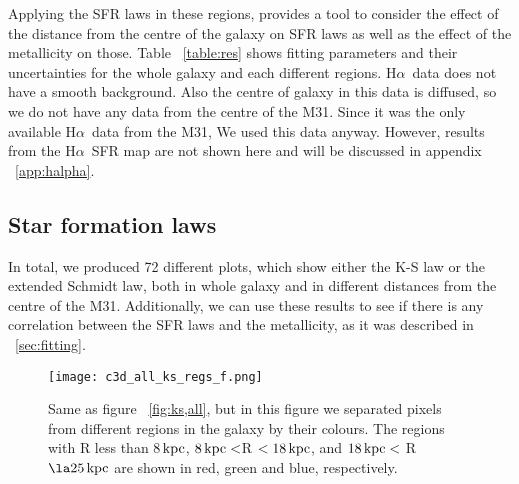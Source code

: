 \documentclass[useAMS,usenatbib]{mn2e}
\newcommand \kpc        {\,{\rm kpc}}
\newcommand \halpha    {H$\alpha $\ }
\begin{document}
Applying the SFR laws in these regions, provides a tool to consider the effect of the distance from the centre of the galaxy on SFR laws as well as the effect of the metallicity on those. Table ~\ref{table:res} shows fitting parameters and their uncertainties for the whole galaxy and each different regions. \halpha data does not have a smooth background. Also the centre of galaxy in this data is diffused, so we do not have any data from the centre of the M31. Since it was the only available \halpha data from the M31, We used this data anyway. However, results from the \halpha SFR map are not shown here and will be discussed in appendix ~\ref{app:halpha}. %

\subsection{Star formation laws}
In total, we produced 72 different plots, which show either the K-S law or the extended Schmidt law, both in whole galaxy and in different distances from the centre of the M31. Additionally, we can use these results to see if there is any correlation  between the SFR laws and the metallicity, as it was described in ~\ref{sec:fitting}.
  

\begin{figure*}
\texttt{[image: c3d\_all\_ks\_regs\_f.png]}
\caption{Same as figure ~\ref{fig:ks,all}, but in this figure we separated pixels from different regions in the galaxy by their colours. The regions with R less than 8$\kpc$, $8\kpc < $R $< 18\kpc$, and $18\kpc <$ R $\la 25\kpc$ are shown in red, green and blue, respectively.}
\label{fig:ks,regs}
\end{figure*}

\end{document}
